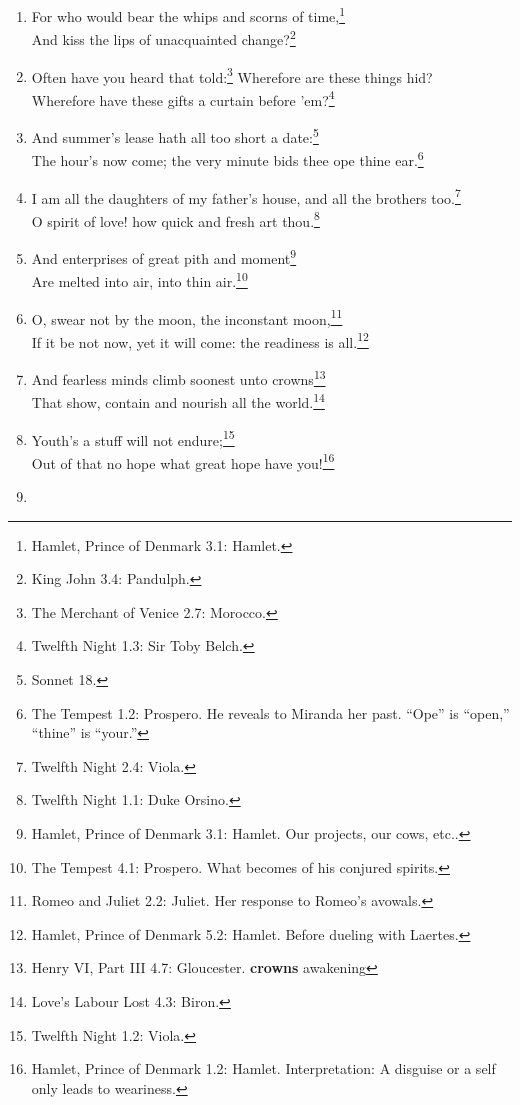 \documentclass[17pt,twoside]{extarticle}
\begin{document}
\begin{enumerate}
  love accompany your hearts!\footnote{A Midsummer Night's Dream 5.1:
    Theseus.}
\item
  For who would bear the whips and scorns of time,\footnote{Hamlet,
    Prince of Denmark 3.1: Hamlet.}\\And kiss the lips of unacquainted
  change?\footnote{King John 3.4: Pandulph.}
\item
  Often have you heard that told:\footnote{The Merchant of Venice 2.7:
    Morocco.} Wherefore are these things hid?\\Wherefore have these
  gifts a curtain before 'em?\footnote{Twelfth Night 1.3: Sir Toby
    Belch.}
\item
  And summer's lease hath all too short a date:\footnote{Sonnet 18.}\\The
  hour's now come; the very minute bids thee ope thine ear.\footnote{The
    Tempest 1.2: Prospero. He reveals to Miranda her past. ``Ope'' is
    ``open,'' ``thine'' is ``your.''}
\item
  I am all the daughters of my father's house, and all the brothers
  too.\footnote{Twelfth Night 2.4: Viola.}\\O spirit of love! how quick
  and fresh art thou.\footnote{Twelfth Night 1.1: Duke Orsino.}
\item
  And enterprises of great pith and moment\footnote{Hamlet, Prince of
    Denmark 3.1: Hamlet. Our projects, our cows, etc..}\\Are melted into
  air, into thin air.\footnote{The Tempest 4.1: Prospero. What becomes
    of his conjured spirits.}
\item
  O, swear not by the moon, the inconstant moon,\footnote{Romeo and
    Juliet 2.2: Juliet. Her response to Romeo's avowals.}\\If it be not
  now, yet it will come: the readiness is all.\footnote{Hamlet, Prince
    of Denmark 5.2: Hamlet. Before dueling with Laertes.}
\item
  And fearless minds climb soonest unto crowns\footnote{Henry VI, Part
    III 4.7: Gloucester. \textbf{crowns} awakening}\\That show, contain
  and nourish all the world.\footnote{Love's Labour Lost 4.3: Biron.}
\item
  Youth's a stuff will not endure;\footnote{Twelfth Night 1.2: Viola.}\\Out
  of that no hope what great hope have you!\footnote{Hamlet, Prince of
    Denmark 1.2: Hamlet. Interpretation: A disguise or a self only leads
    to weariness.}
\item

\end{enumerate}
\end{document}
